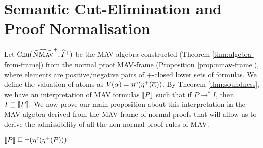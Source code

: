 \section{Semantic Cut-Elimination and Proof Normalisation}
\label{sec:mav-cut-elimination}

Let $\mathrm{Chu}(\widehat{\textsc{NMav}}^+, \mathop{\widehat{I}^+})$ be the MAV-algebra
constructed (Theorem \ref{thm:algebra-from-frame}) from the normal
proof MAV-frame (Proposition \ref{prop:nmav-frame}), where elements
are positive/negative pairs of $+$-closed lower sets of formulas. We
define the valuation of atoms as
$V(\alpha) = \eta^c(\eta^+(\overline{\alpha}))$. By Theorem
\ref{thm:soundness}, we have an interpretation of MAV formulas
$\llbracket P \rrbracket$ such that if $P \longrightarrow^* I$, then
$I \sqsubseteq \llbracket P \rrbracket$. We now prove our main proposition about this
interpretation in the MAV-algebra derived from the MAV-frame of normal
proofs \NMAV{} that will allow us to derive the admissibility of all
the non-normal proof rules of MAV.

\begin{proposition}\label{prop:embedding-sem}
  $\llbracket P \rrbracket \sqsubseteq \lnot (\eta^c(\eta^+(P)))$
\end{proposition}

